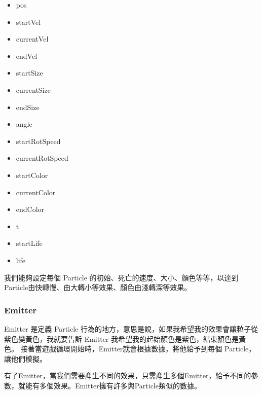 \begin{itemize}
\item{pos}
\item{startVel}
\item{currentVel}
\item{endVel}
\item{startSize}
\item{currentSize}
\item{endSize}
\item{angle}
\item{startRotSpeed}
\item{currentRotSpeed}
\item{startColor}
\item{currentColor}
\item{endColor}
\item{t}
\item{startLife}
\item{life}
\end{itemize}

我們能夠設定每個 Particle 的初始、死亡的速度、大小、顏色等等，以達到Particle由快轉慢、由大轉小等效果、顏色由淺轉深等效果。

\subsubsection{Emitter}

Emitter 是定義 Particle 行為的地方，意思是說，如果我希望我的效果會讓粒子從紫色變黃色，我就要告訴 Emitter 我希望我的起始顏色是紫色，結束顏色是黃色。
接著當遊戲循環開始時，Emitter就會根據數據，將他給予到每個 Particle，讓他們模擬。

有了Emitter，當我們需要產生不同的效果，只需產生多個Emitter，給予不同的參數，就能有多個效果。Emitter擁有許多與Particle類似的數據。

